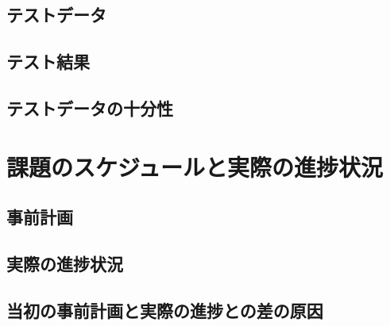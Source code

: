\documentclass{jlreq}
\begin{document}
\subsection{テストデータ}
\subsection{テスト結果}
\subsection{テストデータの十分性}

\section{課題のスケジュールと実際の進捗状況}

\subsection{事前計画}
\subsection{実際の進捗状況}
\subsection{当初の事前計画と実際の進捗との差の原因}
\end{document}
